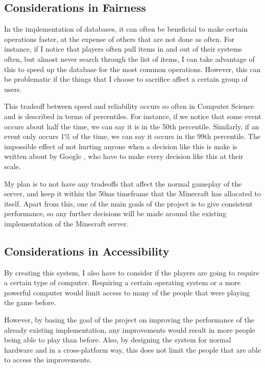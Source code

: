 \documentclass[10pt,twocolumn]{article}
\begin{document}
\subsection{Considerations in Fairness}

In the implementation of databases, it can often be beneficial to make certain
operations faster, at the expense of others that are not done as often. For
instance, if I notice that players often pull items in and out of their systems
often, but almost never search through the list of items, I can take advantage
of this to speed up the database for the most common operations. However, this
can be problematic if the things that I choose to sacrifice affect a certain
group of users.

This tradeoff between speed and reliability occurs so often in Computer Science 
and is described in terms of percentiles. For instance, if we notice that some
event occurs about half the time, we can say it is in the 50th percentile.
Similarly, if an event only occurs 1\% of the time, we can say it occurs in the
99th percentile. The impossible effect of not hurting anyone when a decision
like this is make is written about by Google \cite{dean2013tail}, who have to make every
decision like this at their scale.

My plan is to not have any tradeoffs that affect the normal gameplay of the
server, and keep it within the 50ms timeframe that the Minecraft has allocated
to itself. Apart from this, one of the main goals of the project is to give
consistent performance, so any further decisions will be made around the
existing implementation of the Minecraft server.


\subsection{Considerations in Accessibility}

By creating this system, I also have to consider if the players are going to
require a certain type of computer. Requiring a certain operating system or a
more powerful computer would limit access to many of the people that were
playing the game before.

However, by basing the goal of the project on improving the performance of the
already existing implementation, any improvements would result in more people
being able to play than before. Also, by designing the system for normal
hardware and in a cross-platform way, this does not limit the people that are
able to access the improvements.
\end{document}
